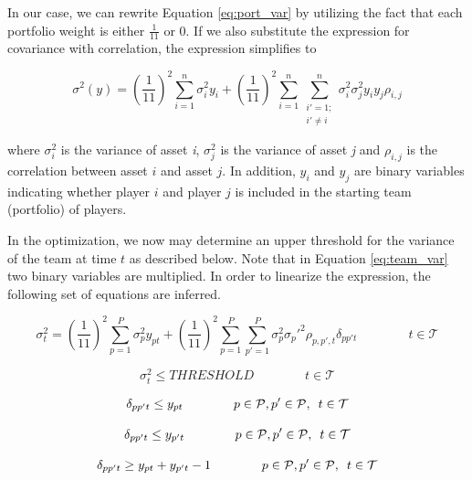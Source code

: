 In our case, we can rewrite Equation \ref{eq:port_var} by utilizing the fact that each portfolio weight is either $\frac{1}{11}$ or $0$. If we also substitute the expression for covariance with correlation, the expression simplifies to

\begin{equation}
    \sigma^2(y) = (\frac{1}{11})^2\sum_{i = 1}^{n}\sigma_i^2y_i + (\frac{1}{11})^2\sum_{i = 1}^{n}\sum_{\substack{i' = 1;\\ i' \neq i}}^{n} \sigma_i^2\sigma_j^2y_iy_j\rho_{i,j}
    \label{eq:team_var}
\end{equation}

where $\sigma_{i}^2$ is the variance of asset \textit{i}, $\sigma_{j}^2$ is the variance of asset \textit{j} and $\rho_{i,j}$ is the correlation between asset $i$ and asset $j$. In addition, $y_i$ and $y_j$ are binary variables indicating whether player $i$ and player $j$ is included in the starting team (portfolio) of players.\newline

In the optimization, we now may determine an upper threshold for the variance of the team at time $t$ as described below. Note that in Equation \ref{eq:team_var} two binary variables are multiplied. In order to linearize the expression, the following set of equations are inferred.

\begin{equation}
    \sigma^2_{t} = (\frac{1}{11})^2\sum_{p = 1}^{P}\sigma_p^2 y_{pt} + (\frac{1}{11})^2\sum_{p = 1}^{P}\sum_{p' = 1}^{P} \sigma_p^2\sigma_p'^2\rho_{p,p',t} \delta_{pp't} \qquad\qquad t \in \mathcal{T}
\end{equation}

\begin{equation}
    \sigma^2_{t} \leq THRESHOLD \qquad\qquad t \in \mathcal{T}
\end{equation}

\begin{equation}
    \delta_{pp't} \leq y_{pt}  \qquad\qquad p \in \mathcal{P}, p' \in \mathcal{P}, \enskip t \in \mathcal{T}
\end{equation}

\begin{equation}
    \delta_{pp't} \leq y_{p't}  \qquad\qquad p \in \mathcal{P}, p' \in \mathcal{P}, \enskip t \in \mathcal{T}
\end{equation}

\begin{equation}
    \delta_{pp't} \geq y_{pt} + y_{p't} - 1  \qquad\qquad p \in \mathcal{P}, p' \in \mathcal{P}, \enskip t \in \mathcal{T}
\end{equation}



